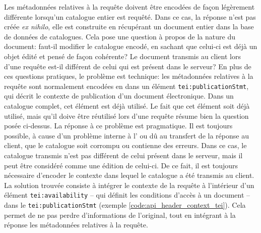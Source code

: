 Les métadonnées relatives à la requête doivent être encodées de façon légèrement différente lorsqu'un catalogue entier est requêté. Dans ce cas, la réponse n'est pas créée \textit{ex nihilo}, elle est construite en récupérant un document entier dans la base de données de catalogues. Cela pose une question à propos de la nature du document: faut-il modifier le catalogue encodé, en sachant que celui-ci est déjà un objet édité et pensé de façon cohérente? Le document transmis au client lors d'une requête est-il différent de celui qui est présent dans le serveur? En plus de ces questions pratiques, le problème est technique: les métadonnées relatives à la requête sont normalement encodées en \tei{} dans un élément \texttt{tei:publicationStmt}, qui décrit le contexte de publication d'un document électronique. Dans un catalogue complet, cet élément est déjà utilisé. Le fait que cet élément soit déjà utilisé, mais qu'il doive être réutilisé lors d'une requête résume bien la question posée ci-dessus. La réponse à ce problème est pragmatique. Il est toujours possible, à cause d'un problème interne à l'\api{} ou dû au transfert de la réponse au client, que le catalogue soit corrompu ou contienne des erreurs. Dans ce cas, le catalogue transmis n'est pas différent de celui présent dans le serveur, mais il peut être considéré comme une édition de celui-ci. De ce fait, il est toujours nécessaire d'encoder le contexte dans lequel le catalogue a été transmis au client. La solution trouvée consiste à intégrer le contexte de la requête à l'intérieur d'un élément \texttt{tei:availability} -- qui définit les conditions d'accès à un document -- dans le \texttt{tei:publicationStmt} (exemple \ref{code:api_header_context_tei}). Cela permet de ne pas perdre d'informations de l'original, tout en intégrant à la réponse les métadonnées relatives à la requête.

